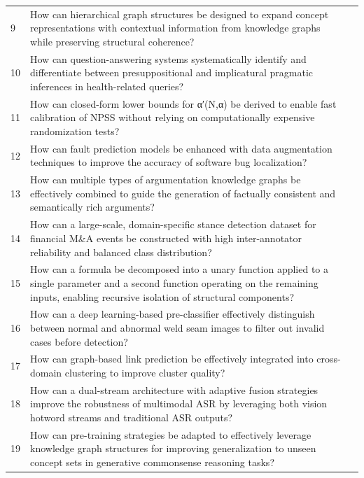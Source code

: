 \begin{longtable}{p{0.8cm}p{9cm}p{2.5cm}}
9 & How can hierarchical graph structures be designed to expand concept representations with contextual information from knowledge graphs while preserving structural coherence? & \cite{10.1609/aaai.v35i7.16796} \\
10 & How can question-answering systems systematically identify and differentiate between presuppositional and implicatural pragmatic inferences in health-related queries? & \cite{10.18653/v1/2024.naacl-long.403} \\
11 & How can closed-form lower bounds for α′(N,α) be derived to enable fast calibration of NPSS without relying on computationally expensive randomization tests? & \cite{10.1609/aaai.v36i4.20339} \\
12 & How can fault prediction models be enhanced with data augmentation techniques to improve the accuracy of software bug localization? & \cite{10.1609/aaai.v33i01.33019446} \\
13 & How can multiple types of argumentation knowledge graphs be effectively combined to guide the generation of factually consistent and semantically rich arguments? & \cite{10.18653/v1/2021.acl-long.366} \\
14 & How can a large-scale, domain-specific stance detection dataset for financial M\&A events be constructed with high inter-annotator reliability and balanced class distribution? & \cite{10.18653/v1/2020.acl-main.157} \\
15 & How can a formula be decomposed into a unary function applied to a single parameter and a second function operating on the remaining inputs, enabling recursive isolation of structural components? & \cite{10.1609/aaai.v38i8.28641} \\
16 & How can a deep learning-based pre-classifier effectively distinguish between normal and abnormal weld seam images to filter out invalid cases before detection? & \cite{10.1609/aaai.v37i13.26834} \\
17 & How can graph-based link prediction be effectively integrated into cross-domain clustering to improve cluster quality? & \cite{10.1609/aaai.v36i11.21654} \\
18 & How can a dual-stream architecture with adaptive fusion strategies improve the robustness of multimodal ASR by leveraging both vision hotword streams and traditional ASR outputs? & \cite{10.18653/v1/2024.emnlp-main.821} \\
19 & How can pre-training strategies be adapted to effectively leverage knowledge graph structures for improving generalization to unseen concept sets in generative commonsense reasoning tasks? & \cite{10.1609/aaai.v35i7.16796} \\

\end{longtable}
